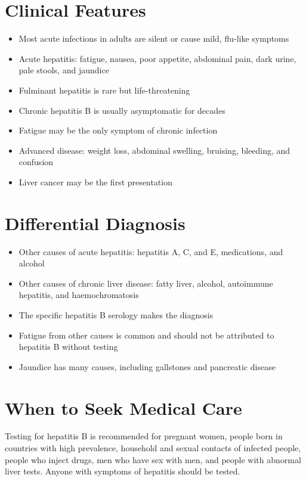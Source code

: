 \section*{Clinical Features}
\begin{itemize}
    \item Most acute infections in adults are silent or cause mild, flu-like symptoms
    \item Acute hepatitis: fatigue, nausea, poor appetite, abdominal pain, dark urine, pale stools, and jaundice
    \item Fulminant hepatitis is rare but life-threatening
    \item Chronic hepatitis B is usually asymptomatic for decades
    \item Fatigue may be the only symptom of chronic infection
    \item Advanced disease: weight loss, abdominal swelling, bruising, bleeding, and confusion
    \item Liver cancer may be the first presentation
\end{itemize}

\section*{Differential Diagnosis}
\begin{itemize}
    \item Other causes of acute hepatitis: hepatitis A, C, and E, medications, and alcohol
    \item Other causes of chronic liver disease: fatty liver, alcohol, autoimmune hepatitis, and haemochromatosis
    \item The specific hepatitis B serology makes the diagnosis
    \item Fatigue from other causes is common and should not be attributed to hepatitis B without testing
    \item Jaundice has many causes, including gallstones and pancreatic disease
\end{itemize}

\section*{When to Seek Medical Care}
Testing for hepatitis B is recommended for pregnant women, people born in countries with high prevalence, household and sexual contacts of infected people, people who inject drugs, men who have sex with men, and people with abnormal liver tests. Anyone with symptoms of hepatitis should be tested.

